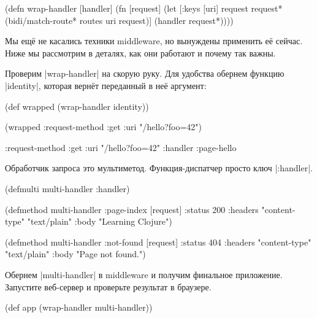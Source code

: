 \begin{english}
  \begin{clojure}
(defn wrap-handler [handler]
  (fn [request]
    (let [{:keys [uri]} request
          request* (bidi/match-route* routes uri request)]
      (handler request*))))
  \end{clojure}
\end{english}

Мы ещ\"{е} не касались техники middleware, но вынуждены применить е\"{е} сейчас. Ниже мы
рассмотрим в деталях, как они работают и почему так важны.

Проверим \spverb|wrap-handler| на скорую руку. Для удобства обернем функцию
\spverb|identity|, которая верн\"{е}т переданный в не\"{е} аргумент:

\begin{english}
  \begin{clojure}
(def wrapped (wrap-handler identity))

(wrapped {:request-method :get
          :uri "/hello?foo=42"})

{:request-method :get
 :uri "/hello?foo=42"
 :handler :page-hello}
  \end{clojure}
\end{english}


Обработчик запроса это мультиметод. Функция-диспатчер просто ключ
\spverb|:handler|.

\begin{english}
  \begin{clojure}
(defmulti multi-handler :handler)

(defmethod multi-handler :page-index
  [request]
  {:status 200
   :headers {"content-type" "text/plain"}
   :body "Learning Clojure"})

(defmethod multi-handler :not-found
  [request]
  {:status 404
   :headers {"content-type" "text/plain"}
   :body "Page not found."})
  \end{clojure}
\end{english}

Обернем \spverb|multi-handler| в middleware и получим финальное
приложение. Запустите веб-сервер и проверьте результат в браузере.

\begin{english}
  \begin{clojure}
(def app (wrap-handler multi-handler))
  \end{clojure}
\end{english}


